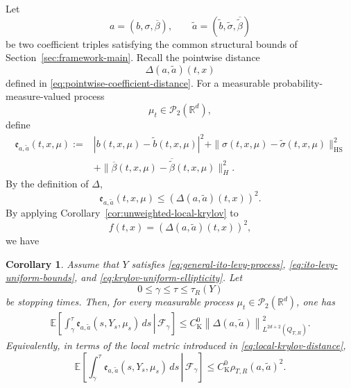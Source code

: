 \documentclass[12pt,oneside, reqno]{amsart}
\newtheorem{corollary}[theorem]{Corollary}
\numberwithin{equation}{section}
\begin{document}
	Let
	\[
	a=(b,\sigma,\overline\beta),
	\qquad
	\widetilde a
	=(\widetilde b,\widetilde\sigma,\overline{\widetilde\beta})
	\]
	be two coefficient triples satisfying the common structural bounds	of Section~\ref{sec:framework-main}. Recall the pointwise distance
	\[
	\Delta(a,\widetilde a)(t,x)
	\]
	defined in
	\eqref{eq:pointwise-coefficient-distance}. For a measurable	probability-measure-valued process
	\[
	\mu_t\in\mathcal P_2(\mathbb R^d),
	\]
	define
	\begin{equation}
		\label{eq:total-coefficient-error}
		\begin{aligned}
			\mathfrak e_{a,\widetilde a}(t,x,\mu)
			:={}&
			|b(t,x,\mu)-\widetilde b(t,x,\mu)|^2+	\|\sigma(t,x,\mu)-\widetilde\sigma(t,x,\mu)\|_{\mathrm{HS}}^2\\
			&+	\|\overline\beta(t,x,\mu)-\overline{\widetilde\beta}(t,x,\mu)\|_H^2.
		\end{aligned}
	\end{equation}
	By the definition of $\Delta$,
	\begin{equation}
		\label{eq:error-controlled-by-delta}
		\mathfrak e_{a,\widetilde a}(t,x,\mu)
		\leq
		(\Delta(a,\widetilde a)(t,x))^2. 	
	\end{equation}
	By applying Corollary~\ref{cor:unweighted-local-krylov} to
	\[
	f(t,x)
	=
	(\Delta(a,\widetilde a)(t,x))^2,
	\]
	we have 
	\begin{corollary}
		\label{cor:coefficient-error-occupation}
		Assume that $Y$ satisfies
		\eqref{eq:general-ito-levy-process},
		\eqref{eq:ito-levy-uniform-bounds}, and
		\eqref{eq:krylov-uniform-ellipticity}. Let
		\[
		0\leq\gamma\leq\tau\leq\tau_R(Y)
		\]
		be stopping times. Then, for every measurable process	$\mu_t\in\mathcal P_2(\mathbb R^d)$,  one has
		\begin{equation}
			\label{eq:combined-coefficient-error-estimate}
			\begin{aligned}
				\mathbb E\left[
				\left.
				\int_\gamma^\tau
				\mathfrak e_{a,\widetilde a}
				(s,Y_s,\mu_s)\,ds
				\,\right|\,\mathcal F_\gamma
				\right]
				\leq
				C_{\mathrm K}^{0}
				\left\|
				\Delta(a,\widetilde a)
				\right\|_{L^{2d+2}(Q_{T,R})}^2.
			\end{aligned}
		\end{equation}
		Equivalently, in terms of the local metric introduced in
		\eqref{eq:local-krylov-distance},
		\begin{equation}
			\label{eq:combined-error-local-metric}
			\mathbb E\left[
			\left.
			\int_\gamma^\tau
			\mathfrak e_{a,\widetilde a}
			(s,Y_s,\mu_s)\,ds
			\,\right|\,\mathcal F_\gamma
			\right]
			\leq
			C_{\mathrm K}^{0}
			\rho_{T,R}(a,\widetilde a)^2.
		\end{equation}
	\end{corollary}
	
\end{document}
